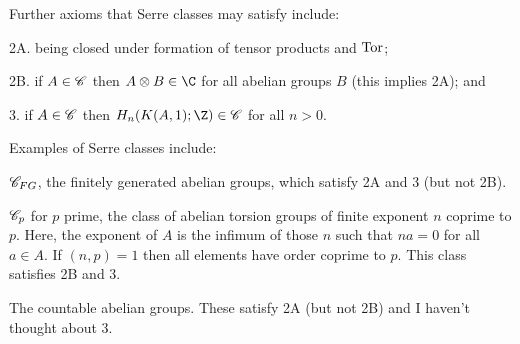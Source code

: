 \documentclass[11pt]{article}
\begin{document}
{Further axioms that Serre classes may satisfy include:
\begin{itemise}
\item[2A.] being closed under formation of tensor products and $\operatorname{Tor}$;
\item[2B.] if  $A\in\mathscr{C}$ then $A\otimes B\in\C$ for all abelian groups $B$ (this implies 2A); and
\item[3.] if $A\in\mathscr{C}$ then $H_n(K(A,1);\Z)\in\scrC$ for all $n>0$.
\end{itemise}
Examples of Serre classes include:
\begin{itemise}
\item $\mathscr{C}_{FG}$, the finitely generated abelian groups, which satisfy 2A and 3 (but not 2B).
\item $\mathscr{C}_{p}$ for $p$ prime, the class of abelian torsion groups of finite exponent $n$ coprime to $p$. Here, the exponent of $A$ is the infimum of those $n$ such that $na=0$ for all $a\in A$. If $(n,p)=1$ then all elements have order coprime to $p$. This class satisfies 2B and 3.
\item The countable abelian groups. These satisfy 2A (but not 2B) and I haven't thought about 3.
\end{itemise}
\setcounter{subsection}{1}
}
\end{document}
